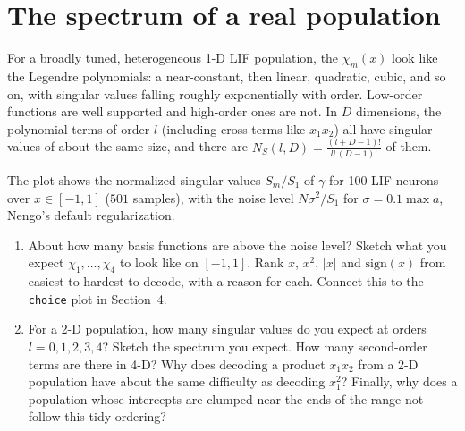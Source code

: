 \documentclass[11pt,letterpaper]{article}
\begin{document}
\section{The spectrum of a real population}

\begin{idea}
For a broadly tuned, heterogeneous 1-D LIF population, the $\chi_m(x)$ look like the Legendre polynomials: a near-constant, then linear, quadratic, cubic, and so on, with singular values falling roughly exponentially with order. Low-order functions are well supported and high-order ones are not. In $D$ dimensions, the polynomial terms of order $l$ (including cross terms like $x_1x_2$) all have singular values of about the same size, and there are $N_S(l, D) = \frac{(l + D - 1)!}{l!\,(D - 1)!}$ of them.
\end{idea}

The plot shows the normalized singular values $S_m/S_1$ of $\gamma$ for 100 LIF neurons over $x \in [-1, 1]$ ($501$ samples), with the noise level $N\sigma^2/S_1$ for $\sigma = 0.1 \max a$, Nengo's default regularization.

\begin{center}
\end{center}

\begin{enumerate}
\item About how many basis functions are above the noise level? Sketch what you expect $\chi_1, \dots, \chi_4$ to look like on $[-1, 1]$. Rank $x$, $x^2$, $|x|$ and $\mathrm{sign}(x)$ from easiest to hardest to decode, with a reason for each. Connect this to the \texttt{choice} plot in Section~4.
\item For a 2-D population, how many singular values do you expect at orders $l = 0, 1, 2, 3, 4$? Sketch the spectrum you expect. How many second-order terms are there in 4-D? Why does decoding a product $x_1x_2$ from a 2-D population have about the same difficulty as decoding $x_1^2$? Finally, why does a population whose intercepts are clumped near the ends of the range not follow this tidy ordering?
\end{enumerate}
\end{document}
